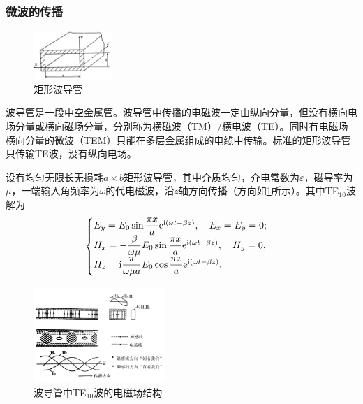 	\subsubsection{微波的传播} %
		\label{ssub:微波的传播}
		\FloatBarrier
		\begin{figure}
			\includegraphics[width=3cm]{fig/scan/Rectangularwaveguide.png}
			\caption{矩形波导管}\label{fig:矩形波导管}
		\end{figure}
		\FloatBarrier
		\par 波导管是一段中空金属管。波导管中传播的电磁波一定由纵向分量，但没有横向电场分量或横向磁场分量，分别称为横磁波（TM）/横电波（TE）。同时有电磁场横向分量的微波（TEM）只能在多层金属组成的电缆中传输。标准的矩形波导管只传输TE波，没有纵向电场。
		\par 设有均匀无限长无损耗$a\times b$矩形波导管，其中介质均匀，介电常数为$\varepsilon$，磁导率为$\mu$，一端输入角频率为$\omega$的代电磁波，沿$z$轴方向传播（方向如\cref{fig:矩形波导管}所示）。其中TE$_{10}$波解为
		\begin{equation}
			\begin{cases}
				E_y=E_0\sin{\dfrac{\pi x}{a}}{\rm e}^{{\rm i}(\omega t-\beta z)},\quad E_x=E_y=0;\\
				H_x=-\dfrac{\beta}{\omega\mu}E_0\sin{\dfrac{\pi x}{a}}{\rm e}^{{\rm i}(\omega t-\beta z)},\quad H_y=0,\\
				H_z={\rm i}\dfrac{\pi}{\omega\mu a}E_0\cos{\dfrac{\pi x}{a}}{\rm e}^{{\rm i}(\omega t-\beta z)}.
			\end{cases}\label{eq:emwave}
		\end{equation}
		\FloatBarrier
		\begin{figure}
			\includegraphics[width=5cm]{fig/scan/StructureoftheEMFieldofTE10Wave.png}
			\caption{波导管中TE$_{10}$波的电磁场结构}\label{fig:波导管中TE10波的电磁场结构}
		\end{figure}
		\FloatBarrier
